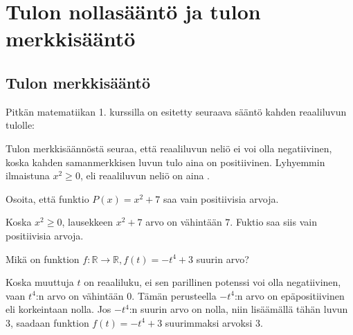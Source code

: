 \section{Tulon nollasääntö ja tulon merkkisääntö}

\subsection*{Tulon merkkisääntö}

Pitkän matematiikan 1. kurssilla on esitetty seuraava sääntö kahden reaaliluvun tulolle:


Tulon merkkisäännöstä seuraa, että reaaliluvun neliö ei voi olla negatiivinen, koska kahden samanmerkkisen luvun tulo aina on positiivinen. Lyhyemmin ilmaistuna $x^2 \geq 0$, eli reaaliluvun neliö on aina .

\begin{esimerkki}
Osoita, että funktio $P(x)=x^2+7$ saa vain positiivisia arvoja.
    \begin{esimratk}
	Koska $x^2 \geq 0$, lausekkeen $x^2+7$ arvo on vähintään $7$. Fuktio saa siis
	vain positiivisia arvoja.
    \end{esimratk}
\end{esimerkki}

\begin{esimerkki}
Mikä on funktion $f:\mathbb{R} \rightarrow \mathbb{R}, f(t)=-t^4+3$ suurin arvo?
    \begin{esimratk}
	Koska muuttuja $t$ on reaaliluku, ei sen parillinen potenssi voi olla negatiivinen, vaan $t^4$:n arvo on vähintään $0$. Tämän perusteella $-t^4$:n arvo on epäpositiivinen eli korkeintaan nolla. Jos $-t^4$:n suurin arvo on nolla, niin lisäämällä tähän luvun $3$, saadaan funktion $f(t)=-t^4+3$ suurimmaksi arvoksi $3$.
    \end{esimratk}
\end{esimerkki}

